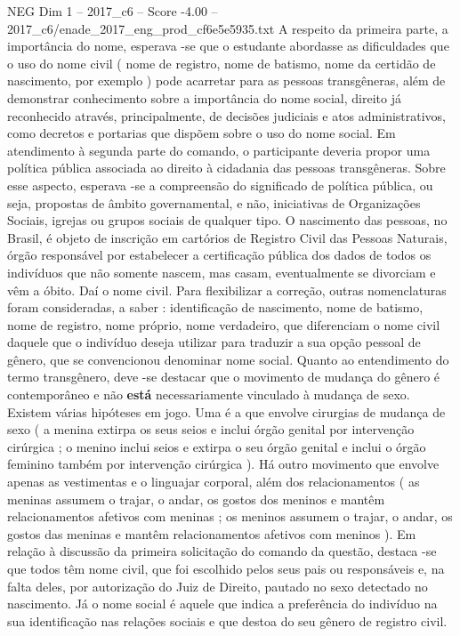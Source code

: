 \begin{textsample}{NEG Dim 1 – 2017\_c6 – Score -4.00 – 2017\_c6/enade\_2017\_eng\_prod\_cf6e5e5935.txt}
A respeito da primeira parte, a importância do nome, esperava -se que o estudante abordasse as dificuldades que o uso do nome civil ( nome de registro, nome de batismo, nome da certidão de nascimento, por exemplo ) pode acarretar para as pessoas transgêneras, além de demonstrar conhecimento sobre a importância do nome social, direito já reconhecido através, principalmente, de decisões judiciais e atos administrativos, como decretos e portarias que dispõem sobre o uso do nome social.
Em atendimento à segunda parte do comando, o participante deveria propor uma política pública associada ao direito à cidadania das pessoas transgêneras.
Sobre esse aspecto, esperava -se a compreensão do significado de política pública, ou seja, propostas de âmbito governamental, e não, iniciativas de Organizações Sociais, igrejas ou grupos sociais de qualquer tipo.
O nascimento das pessoas, no Brasil, é objeto de inscrição em cartórios de Registro Civil das Pessoas Naturais, órgão responsável por estabelecer a certificação pública dos dados de todos os indivíduos que não somente nascem, mas casam, eventualmente se divorciam e vêm a óbito.
Daí o nome civil.
Para flexibilizar a correção, outras nomenclaturas foram consideradas, a saber : identificação de nascimento, nome de batismo, nome de registro, nome próprio, nome verdadeiro, que diferenciam o nome civil daquele que o indivíduo deseja utilizar para traduzir a sua opção pessoal de gênero, que se convencionou denominar nome social.
Quanto ao entendimento do termo transgênero, deve -se destacar que o movimento de mudança do gênero é contemporâneo e não \textbf{está} necessariamente vinculado à mudança de sexo.
Existem várias hipóteses em jogo.
Uma é a que envolve cirurgias de mudança de sexo ( a menina extirpa os seus seios e inclui órgão genital por intervenção cirúrgica ; o menino inclui seios e extirpa o seu órgão genital e inclui o órgão feminino também por intervenção cirúrgica ).
Há outro movimento que envolve apenas as vestimentas e o linguajar corporal, além dos relacionamentos ( as meninas assumem o trajar, o andar, os gostos dos meninos e mantêm relacionamentos afetivos com meninas ; os meninos assumem o trajar, o andar, os gostos das meninas e mantêm relacionamentos afetivos com meninos ).
Em relação à discussão da primeira solicitação do comando da questão, destaca -se que todos têm nome civil, que foi escolhido pelos seus pais ou responsáveis e, na falta deles, por autorização do Juiz de Direito, pautado no sexo detectado no nascimento.
Já o nome social é aquele que indica a preferência do indivíduo na sua identificação nas relações sociais e que destoa do seu gênero de registro civil.

\end{textsample}

